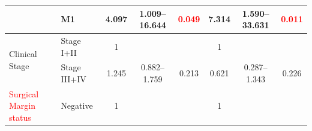 \documentclass[
paper=landscape,
paper=160mm:90mm, %
fontsize=11pt, %
pagesize, %
parskip=half-, %
]{scrartcl} %
\theoremstyle{mythmstyle} %
\begin{document}
\begin{table}[H]
{\begin{tabular}{|l|l|c|c|c|c|c|c|}
\cline{2-8}
                                        & M1                                                                                  & 4.097                                                                          & 1.009--16.644                                                                  & \textcolor{red}{0.049}                                                        & 7.314                                                                          & 1.590--33.631                                                                  & \textcolor{red}{0.011}                                                         \\ 
\hline
\multirow{2}{*}{Clinical Stage}         & {\cellcolor[rgb]{0.62,0.812,0.878}}Stage I+II                                       & {\cellcolor[rgb]{0.62,0.812,0.878}}1                                           & {\cellcolor[rgb]{0.62,0.812,0.878}}                                           & {\cellcolor[rgb]{0.62,0.812,0.878}}                                           & {\cellcolor[rgb]{0.62,0.812,0.878}}1                                           & {\cellcolor[rgb]{0.62,0.812,0.878}}                                           & {\cellcolor[rgb]{0.62,0.812,0.878}}                                            \\ 
\cline{2-8}
                                        & Stage III+IV                                                                        & 1.245                                                                          & 0.882--1.759                                                                   & 0.213                                                                         & 0.621                                                                          & 0.287--1.343                                                                   & 0.226                                                                          \\ 
\hline
\multirow{2}{*}{\textcolor{red}{Surgical Margin status}} & {\cellcolor[rgb]{0.62,0.812,0.878}}Negative                                         & {\cellcolor[rgb]{0.62,0.812,0.878}}1                                           & {\cellcolor[rgb]{0.62,0.812,0.878}}                                           & {\cellcolor[rgb]{0.62,0.812,0.878}}                                           & {\cellcolor[rgb]{0.62,0.812,0.878}}1                                           & {\cellcolor[rgb]{0.62,0.812,0.878}}                                           & {\cellcolor[rgb]{0.62,0.812,0.878}}                                            \\ 

\end{tabular}}
\end{table}
\end{document}

